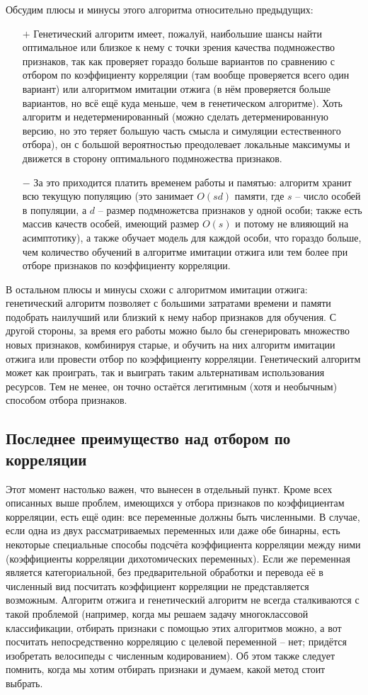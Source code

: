 \documentclass[12pt,fleqn]{article}
\begin{document}
	Обсудим плюсы и минусы этого алгоритма относительно предыдущих:
	\begin{itemize}
		\item[$ + $] Генетический алгоритм имеет, пожалуй, наибольшие шансы найти оптимальное или близкое к нему с точки зрения качества подмножество признаков, так как проверяет гораздо больше вариантов по сравнению с отбором по коэффициенту корреляции (там вообще проверяется всего один вариант) или алгоритмом имитации отжига (в нём проверяется больше вариантов, но всё ещё куда меньше, чем в генетическом алгоритме). Хоть алгоритм и недетерменированный (можно сделать детерменированную версию, но это теряет большую часть смысла и симуляции естественного отбора), он с большой вероятностью преодолевает локальные максимумы и движется в сторону оптимального подмножества признаков.
		\item[$ - $] За это приходится платить временем работы и памятью: алгоритм хранит всю текущую популяцию (это занимает $ O(sd) $ памяти, где $ s $ -- число особей в популяции, а $ d $ -- размер подмножетсва признаков у одной особи; также есть массив качеств особей, имеющий размер $ O(s) $ и потому не влияющий на асимптотику), а также обучает модель для каждой особи, что гораздо больше, чем количество обучений в алгоритме имитации отжига или тем более при отборе признаков по коэффициенту корреляции.
	\end{itemize}

	В остальном плюсы и минусы схожи с алгоритмом имитации отжига: генетический алгоритм позволяет с большими затратами времени и памяти подобрать наилучший или близкий к нему набор признаков для обучения. С другой стороны, за время его работы можно было бы сгенерировать множество новых признаков, комбинируя старые, и обучить на них алгоритм имитации отжига или провести отбор по коэффициенту корреляции. Генетический алгоритм может как проиграть, так и выиграть таким альтернативам использования ресурсов. Тем не менее, он точно остаётся легитимным (хотя и необычным) способом отбора признаков.

	\subsection{Последнее преимущество над отбором по корреляции}

	Этот момент настолько важен, что вынесен в отдельный пункт. Кроме всех описанных выше проблем, имеющихся у отбора признаков по коэффициентам корреляции, есть ещё один: все переменные должны быть численными. В случае, если одна из двух рассматриваемых переменных или даже обе бинарны, есть некоторые специальные способы подсчёта коэффициента корреляции между ними (коэффициенты корреляции дихотомических переменных). Если же переменная является категориальной, без предварительной обработки и перевода её в численный вид посчитать коэффициент корреляции не представляется возможным. Алгоритм отжига и генетический алгоритм не всегда сталкиваются с такой проблемой (например, когда мы решаем задачу многоклассовой классификации, отбирать признаки с помощью этих алгоритмов можно, а вот посчитать непосредственно корреляцию с целевой переменной -- нет; придётся изобретать велосипеды с численным кодированием). Об этом также следует помнить, когда мы хотим отбирать признаки и думаем, какой метод стоит выбрать.
\end{document}
